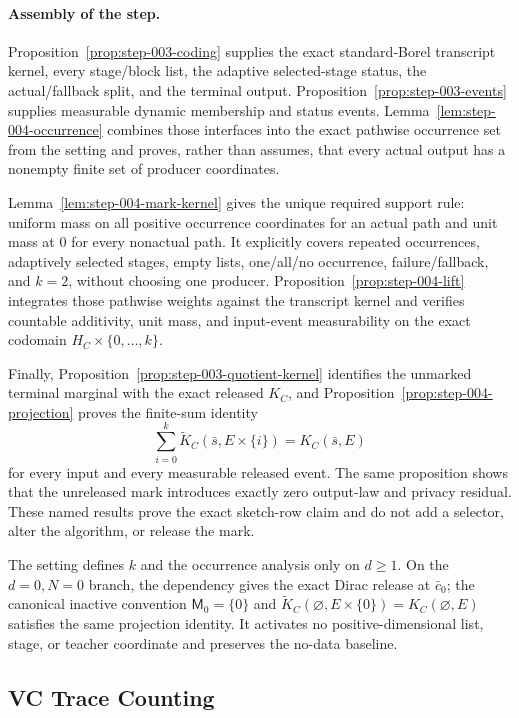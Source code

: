 \paragraph{Assembly of the step.}


Proposition~\ref{prop:step-003-coding} supplies the exact
standard-Borel transcript kernel, every stage/block list, the adaptive
selected-stage status, the actual/fallback split, and the terminal output.
Proposition~\ref{prop:step-003-events} supplies measurable dynamic
membership and status events. Lemma~\ref{lem:step-004-occurrence} combines
those  interfaces into the exact pathwise occurrence set from the
setting and proves, rather than assumes, that every actual output has a
nonempty finite set of producer coordinates.

Lemma~\ref{lem:step-004-mark-kernel} gives the unique required support rule:
uniform mass on all positive occurrence coordinates for an actual path and
unit mass at \(0\) for every nonactual path. It explicitly covers repeated
occurrences, adaptively selected stages, empty lists, one/all/no occurrence,
failure/fallback, and \(k=2\), without choosing one producer.
Proposition~\ref{prop:step-004-lift} integrates those pathwise weights
against the  transcript kernel and verifies countable additivity,
unit mass, and input-event measurability on the exact codomain
\(H_C\times\{0,\ldots,k\}\).

Finally, Proposition~\ref{prop:step-003-quotient-kernel} identifies
the unmarked terminal marginal with the exact released \(K_C\), and
Proposition~\ref{prop:step-004-projection} proves the finite-sum identity
\[
\sum_{i=0}^k
\widetilde K_C(\bar s,E\times\{i\})=K_C(\bar s,E)
\]
for every input and every measurable released event. The same proposition
shows that the unreleased mark introduces exactly zero output-law and
privacy residual. These named results prove the exact sketch-row claim and
do not add a selector, alter the algorithm, or release the mark.

The setting defines \(k\) and the occurrence analysis only on \(d\geq1\).
On the \(d=0,N=0\) branch, the  dependency gives the exact Dirac
release at \(\bar c_0\); the canonical inactive convention
\(\mathsf M_0=\{0\}\) and
\(\widetilde K_C(\varnothing,E\times\{0\})=K_C(\varnothing,E)\) satisfies
the same projection identity. It activates no positive-dimensional list,
stage, or teacher coordinate and preserves the no-data baseline.



\subsection{VC Trace Counting}\label{app:step_005}

